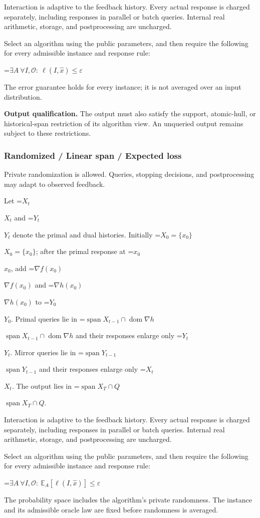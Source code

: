 \documentclass[10pt,a4paper]{article}
\newcommand{\AtlasMath}[1]{\par\begingroup\centering\setbox0=\hbox{$\displaystyle #1$}\ifdim\wd0>1.4\linewidth\typeout{ATLAS WIDE FORMULA: \the\wd0}\fi\ifdim\wd0>\linewidth\resizebox{\linewidth}{!}{\box0}\else\box0\fi\par\endgroup}
\newcommand{\AtlasInlineMath}[1]{\begingroup\setbox0=\hbox{$#1$}\ifdim\wd0>.4\linewidth\endgroup\AtlasMath{#1}\else\endgroup$#1$\fi}
\begin{document}
Interaction is adaptive to the feedback history. Every actual response is charged separately, including responses in parallel or batch queries. Internal real arithmetic, storage, and postprocessing are uncharged.

Select an algorithm using the public parameters, and then require the following for every admissible instance and response rule:


\AtlasMath{\exists A\ \forall I,\mathcal{O}:\ \ell(I,\widehat{x})\le\varepsilon}


The error guarantee holds for every instance; it is not averaged over an input distribution.

\textbf{Output qualification.} The output must also satisfy the support, atomic-hull, or historical-span restriction of its algorithm view. An unqueried output remains subject to these restrictions.

\subsubsection{Randomized / Linear span / Expected loss}
Private randomization is allowed. Queries, stopping decisions, and postprocessing may adapt to observed feedback.

Let \AtlasInlineMath{X_t} and \AtlasInlineMath{Y_t} denote the primal and dual histories. Initially \AtlasInlineMath{X_0=\{x_0\}}; after the primal response at \AtlasInlineMath{x_0}, add \AtlasInlineMath{\nabla f(x_0)} and \AtlasInlineMath{\nabla h(x_0)} to \AtlasInlineMath{Y_0}. Primal queries lie in \AtlasInlineMath{\operatorname{span}X_{t-1}\cap\operatorname{dom}\nabla h} and their responses enlarge only \AtlasInlineMath{Y_t}. Mirror queries lie in \AtlasInlineMath{\operatorname{span}Y_{t-1}} and their responses enlarge only \AtlasInlineMath{X_t}. The output lies in \AtlasInlineMath{\operatorname{span}X_T\cap Q}.

Interaction is adaptive to the feedback history. Every actual response is charged separately, including responses in parallel or batch queries. Internal real arithmetic, storage, and postprocessing are uncharged.

Select an algorithm using the public parameters, and then require the following for every admissible instance and response rule:


\AtlasMath{\exists A\ \forall I,\mathcal{O}:\ \mathbb{E}_A[\ell(I,\widehat{x})]\le\varepsilon}


The probability space includes the algorithm's private randomness. The instance and its admissible oracle law are fixed before randomness is averaged.
\end{document}
